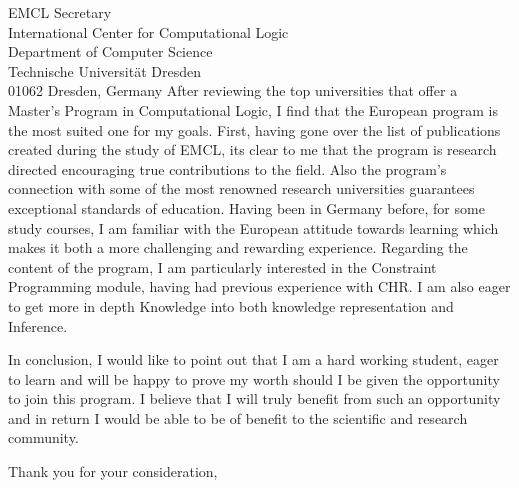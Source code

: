 \documentclass[11pt]{letter} %
\begin{document}
\begin{letter}{
EMCL Secretary \\
International Center for Computational Logic \\
Department of Computer Science\\
Technische Universität Dresden \\
01062 Dresden,
Germany}
  After reviewing the top universities that offer a Master's Program in
  Computational Logic, I find that the European program is the most suited one
  for my goals. First, having gone over the list of publications created during
  the study of EMCL, its clear to me that the program is research directed
  encouraging true contributions to the field. Also the program's connection
  with some of the most renowned research universities guarantees exceptional
  standards of education. Having been in Germany before, for some study courses,
  I am familiar with the European attitude towards learning which makes it both
  a more challenging and rewarding experience. Regarding the content of the
  program, I am particularly interested in the Constraint Programming module,
  having had previous experience with CHR. I am also eager to get more in depth
  Knowledge into both knowledge representation and Inference.

  In conclusion, I would like to point out that I am a hard working student,
  eager to learn and will be happy to prove my worth should I be given the
  opportunity to join this program. I believe that I will truly benefit from
  such an opportunity and in return I would be able to be of benefit to the
  scientific and research community.

\closing{Thank you for your consideration,}


\end{letter}
\end{document}
